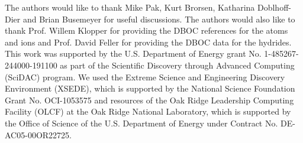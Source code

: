 The authors would like to thank Mike Pak, Kurt Brorsen, Katharina Doblhoff-Dier and Brian Busemeyer for useful discussions. The authors would also like to thank Prof. Willem Klopper for providing the DBOC references for the atoms and ions and Prof. David Feller for providing the DBOC data for the hydrides. This work was supported by the U.S. Department of Energy grant No. 1-485267-244000-191100 as part of the Scientific Discovery through Advanced Computing (SciDAC) program. We used the Extreme Science and Engineering Discovery Environment (XSEDE), which is supported by the National Science Foundation Grant No. OCI-1053575 and resources of the Oak Ridge Leadership Computing Facility (OLCF) at the Oak Ridge National Laboratory, which is supported by the Office of Science of the U.S. Department of Energy under Contract No. DE-AC05-00OR22725.